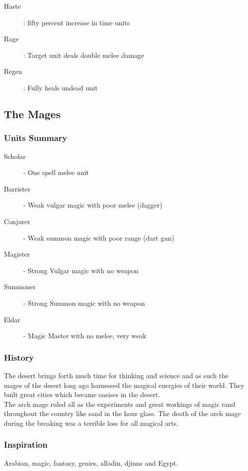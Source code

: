 \documentclass[a4paper,twocolumn]{article}
\begin{document}
\begin{description}
\item[Haste]: fifty percent increase in time units
\item[Rage]: Target unit deals double melee damage
\item[Regen]: Fully heals undead unit
\end{description}

\subsection{The Mages}

\subsubsection{Units Summary}

\begin{description}
\item[Scholar] -  One spell melee unit
\item[Barrister] - Weak vulgar magic with poor melee (dagger)
\item[Conjurer] - Weak summon magic with poor range (dart gun)
\item[Magister] - Strong Vulgar magic with no weapon
\item[Summoner] - Strong Summon magic with no weapon
\item[Eldar] - Magic Master with no melee, very weak
\end{description}

\subsubsection{History}
The desert brings forth much time for thinking and science and as such the mages of the desert long ago harnessed the magical energies of their world. They built great cities which became oasises in the desert.\\
The arch mage ruled all as the experiments and great workings of magic rand throughout the country like sand in the hour glass. The death of the arch mage during the breaking was a terrible loss for all magical arts.\\

\subsubsection{Inspiration}
Arabian, magic, fantasy, genies, alladin, djinns and Egypt.
\end{document}
